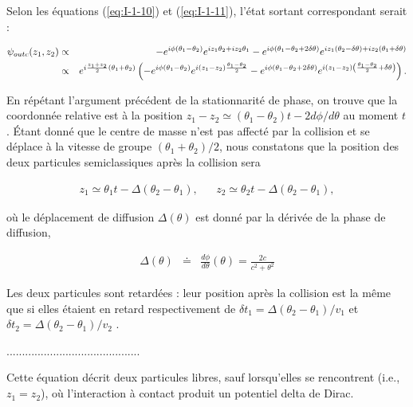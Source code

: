 Selon les équations (\ref{eq:I-1-10}) et (\ref{eq:I-1-11}), l'état sortant correspondant serait :

\begin{eqnarray}
	\psi_{outc} ( z_1 , z_2 ) & \propto & - e^{i\phi ( \theta_1 - \theta_2 ) }  e^{ iz_1 \theta_2 + i z_2 \theta_1 }  - e^{i\phi ( \theta_1 - \theta_2 + 2\delta \theta ) }  e^{ iz_1 (\theta_2- \delta \theta )  + i z_2 (\theta_1 + \delta \theta )  } \notag  \\
	& \propto & e^{i \frac{ z_1 + z_2 }{2} ( \theta_1 + \theta_2 ) }  \left ( - e^{ i \phi ( \theta_1 - \theta_2 ) }e^{i(z_1 - z_2 ) \frac{ \theta_1 - \theta_2}{2} } -e^{ i \phi ( \theta_1 - \theta_2 + 2 \delta \theta ) }e^{i(z_1 - z_2 )  \left ( \frac{ \theta_1 - \theta_2}{2} + \delta \theta \right )  }  \right ). %
\end{eqnarray}

En répétant l'argument précédent de la stationnarité de phase, on trouve que la coordonnée relative est à la position $z_1 - z_2 \simeq (\theta_1 - \theta_2)t - 2d\phi /d\theta$ au moment $t$. Étant donné que le centre de masse n'est pas affecté par la collision et se déplace à la vitesse de groupe $(\theta_1 + \theta_2)/2$, nous constatons que la position des deux particules semiclassiques après la collision sera

\begin{eqnarray}
	z_1 \simeq \theta _1 t - \Delta ( \theta_2 -\theta_1 ), & &	z_2 \simeq \theta _2 t - \Delta ( \theta_2 -\theta_1 ),
\end{eqnarray}

où le déplacement de diffusion $\Delta (\theta)$ est donné par la dérivée de la phase de diffusion,

\begin{eqnarray}\label{eq:I-1-16}
	\Delta ( \theta ) & \doteq & \frac{ d \phi }{ d \theta } ( \theta )= \frac{ 2 c }{ c^2 + \theta^2}  	
\end{eqnarray}

Les deux particules sont retardées : leur position après la collision est la même que si elles étaient en retard respectivement de $\delta t_1 = \Delta ( \theta_2 - \theta_1 )/v_1 $ et $\delta t_2 = \Delta ( \theta_2 - \theta_1 )/v_2 $ .

...........................................

Cette équation décrit deux particules libres, sauf lorsqu'elles se rencontrent (i.e., \(z_1 = z_2\)), où l'interaction à contact produit un potentiel delta de Dirac.

